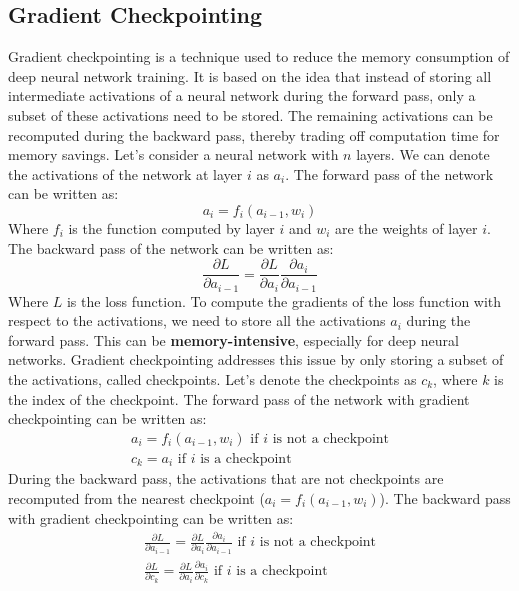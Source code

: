 \documentclass{article}
\begin{document}
	\subsection{Gradient Checkpointing}  
	Gradient checkpointing \cite{chen2016trainingdeepnetssublinear} is a technique used to reduce the memory consumption of deep neural network training. 
	It is based on the idea that instead of storing all intermediate activations of a neural network during the forward pass, only a subset of these activations need to be stored.
	The remaining activations can be recomputed during the backward pass, thereby trading off computation time for memory savings.
	Let's consider a neural network with $n$ layers. We can denote the activations of the network at layer $i$ as $a_i$. The forward pass of the network can be written as:
	\begin{equation}
		a_i = f_i(a_{i-1}, w_i)
	\end{equation}
	Where $f_i$ is the function computed by layer $i$ and $w_i$ are the weights of layer $i$.
	The backward pass of the network can be written as:
	\begin{equation}
	\frac{\partial L}{\partial a_{i-1}} = \frac{\partial L}{\partial a_i} \frac{\partial a_i}{\partial a_{i-1}}
	\end{equation}
	Where $L$ is the loss function. To compute the gradients of the loss function with respect to the activations, we need to store all the activations $a_i$ during the forward pass. This can be \textbf{memory-intensive}, especially for deep neural networks.
	Gradient checkpointing addresses this issue by only storing a subset of the activations, called checkpoints. 
	Let's denote the checkpoints as $c_k$, where $k$ is the index of the checkpoint. The forward pass of the network with gradient checkpointing can be written as:
	\begin{gather}
		a_i = f_i(a_{i-1}, w_i) \text{ if $i$ is not a checkpoint} \\
		c_k = a_i \text{ if $i$ is a checkpoint}
	\end{gather}
	During the backward pass, the activations that are not checkpoints are recomputed from the nearest checkpoint ($a_i = f_i(a_{i-1}, w_i)$). The backward pass with gradient checkpointing can be written as:
	\begin{gather}
		\frac{\partial L}{\partial a_{i-1}} = \frac{\partial L}{\partial a_i} \frac{\partial a_i}{\partial a_{i-1}} \text{ if $i$ is not a checkpoint} \\
		\frac{\partial L}{\partial c_k} = \frac{\partial L}{\partial a_i} \frac{\partial a_i}{\partial c_k} \text{ if $i$ is a checkpoint}
	\end{gather}
	
\end{document}
